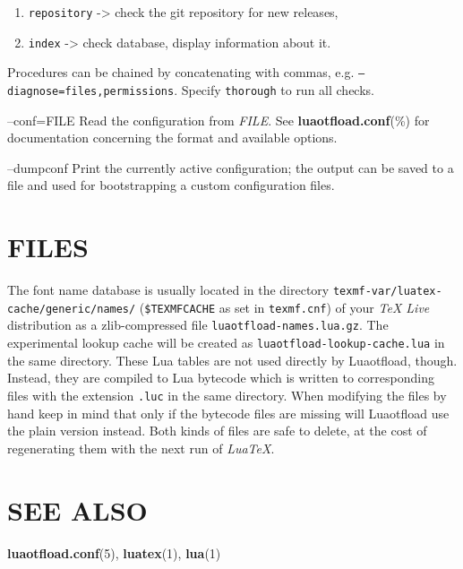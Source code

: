 \documentclass[a4paper]{article}
\providecommand*{\DUoptionlistlabel}[1]{\bf #1 \hfill}
\newenvironment{DUoptionlist}{%
    \list{}{\setlength{\labelwidth}{\DUoptionlistindent}
            \setlength{\rightmargin}{1cm}
            \setlength{\leftmargin}{\rightmargin}
            \addtolength{\leftmargin}{\labelwidth}
            \addtolength{\leftmargin}{\labelsep}
            \renewcommand{\makelabel}{\DUoptionlistlabel}}
  }
  {\endlist}
\begin{document}
\begin{DUoptionlist}
\begin{enumerate}
\begin{description}
\end{description}

\item \texttt{repository} -> check the git repository
for new releases,

\item \texttt{index} -> check database, display
information about it.
\end{enumerate}

Procedures can be chained by concatenating with
commas, e.g. \texttt{--diagnose=files,permissions}.
Specify \texttt{thorough} to run all checks.

\item[--conf=FILE]  Read the configuration from \emph{FILE}. See
\textbf{luaotfload.conf}(\%) for documentation
concerning the format and available options.

\item[--dumpconf]  Print the currently active configuration; the
output can be saved to a file and used for
bootstrapping a custom configuration files.
\end{DUoptionlist}


\section{FILES%
  \label{files}%
}

The font name database is usually located in the directory
\texttt{texmf-var/luatex-cache/generic/names/} (\texttt{\$TEXMFCACHE} as set in
\texttt{texmf.cnf}) of your \emph{TeX Live} distribution as a zlib-compressed
file \texttt{luaotfload-names.lua.gz}.
The experimental lookup cache will be created as
\texttt{luaotfload-lookup-cache.lua} in the same directory.
These Lua tables are not used directly by Luaotfload, though.
Instead, they are compiled to Lua bytecode which is written to
corresponding files with the extension \texttt{.luc} in the same directory.
When modifying the files by hand keep in mind that only if the bytecode
files are missing will Luaotfload use the plain version instead.
Both kinds of files are safe to delete, at the cost of regenerating
them with the next run of \emph{LuaTeX}.


\section{SEE ALSO%
  \label{see-also}%
}

\textbf{luaotfload.conf}(5), \textbf{luatex}(1), \textbf{lua}(1)
\end{document}
